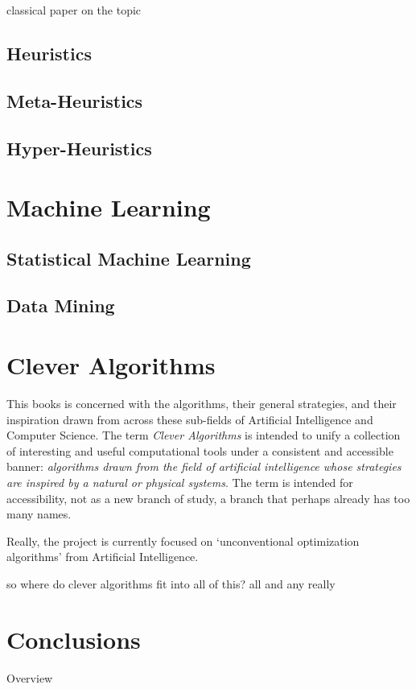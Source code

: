 \documentclass[a4paper, 11pt]{article}
\begin{document}
classical paper on the topic \cite{Blum2003}

\subsection{Heuristics}

\subsection{Meta-Heuristics}

\subsection{Hyper-Heuristics}


% 
% 
\section{Machine Learning}
\label{sec:machine_learning}

\subsection{Statistical Machine Learning}

\subsection{Data Mining}

% 
% 
\section{Clever Algorithms}
\label{sec:clever_algorithms}
This books is concerned with the algorithms, their general strategies, and their inspiration drawn from across these sub-fields of Artificial Intelligence and Computer Science. The term \emph{Clever Algorithms} is intended to unify a collection of interesting and useful computational tools under a consistent and accessible banner: \emph{algorithms drawn from the field of artificial intelligence whose strategies are inspired by a natural or physical systems}. The term is intended for accessibility, not as a new branch of study, a branch that perhaps already has too many names.

Really, the project is currently focused on `unconventional optimization algorithms' from Artificial Intelligence.

so where do clever algorithms fit into all of this?
all and any really


\section{Conclusions}
\label{sec:conclusions}
Overview





\end{document}

